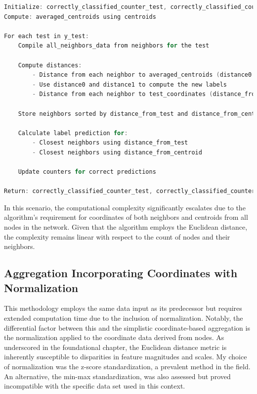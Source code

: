 \begin{lstlisting}[language=C]
Initialize: correctly_classified_counter_test, correctly_classified_counter_centroids
Compute: averaged_centroids using centroids

For each test in y_test:
    Compile all_neighbors_data from neighbors for the test

    Compute distances:
        - Distance from each neighbor to averaged_centroids (distance0 and distance1)
        - Use distance0 and distance1 to compute the new labels
        - Distance from each neighbor to test_coordinates (distance_from_test)

    Store neighbors sorted by distance_from_test and distance_from_centroid

    Calculate label prediction for:
        - Closest neighbors using distance_from_test
        - Closest neighbors using distance_from_centroid

    Update counters for correct predictions

Return: correctly_classified_counter_test, correctly_classified_counter_centroids
\end{lstlisting}

In this scenario, the computational complexity significantly escalates due to the algorithm's requirement for coordinates of both neighbors and centroids from all nodes in the network. Given that the algorithm employs the Euclidean distance, the complexity remains linear with respect to the count of nodes and their neighbors.


\subsection{Aggregation Incorporating Coordinates with Normalization}

This methodology employs the same data input as its predecessor but requires extended computation time due to the inclusion of normalization. Notably, the differential factor between this and the simplistic coordinate-based aggregation is the normalization applied to the coordinate data derived from nodes. As underscored in the foundational chapter, the Euclidean distance metric is inherently susceptible to disparities in feature magnitudes and scales. My choice of normalization was the z-score standardization, a prevalent method in the field. An alternative, the min-max standardization, was also assessed but proved incompatible with the specific data set used in this context.

